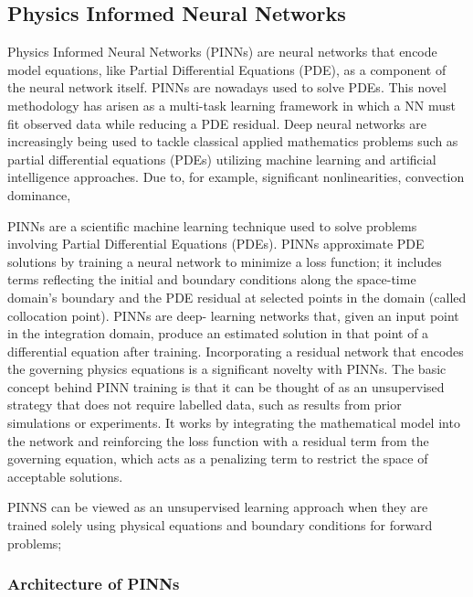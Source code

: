 \documentclass{article}
\begin{document}

\subsection{Physics Informed Neural Networks}

Physics Informed Neural Networks (PINNs) are neural networks that encode model equations, like Partial Differential Equations (PDE), as a component of the neural network itself. PINNs are nowadays used to solve PDEs. This novel methodology has arisen as a multi-task learning framework in which a NN must fit observed data while reducing a PDE residual. 
Deep neural networks are increasingly being used to tackle classical applied mathematics problems such as partial differential equations (PDEs) utilizing machine learning and artificial intelligence approaches. Due to, for example, significant nonlinearities, convection dominance, 


PINNs are a scientific machine learning technique used to solve problems involving Partial Differential Equations (PDEs). PINNs approximate PDE solutions by training a neural network to minimize a loss function; it includes terms reflecting the initial and boundary conditions along the space-time domain’s boundary and the PDE residual at selected points in the domain (called collocation point). PINNs are deep- learning networks that, given an input point in the integration domain, produce an estimated solution in that point of a differential equation after training. Incorporating a residual network that encodes the governing physics equations is a significant novelty with PINNs. The basic concept behind PINN training is that it can be thought of as an unsupervised strategy that does not require labelled data, such as results from prior simulations or experiments.
It works by integrating the mathematical model into the network and reinforcing the loss function with a residual term from the governing equation, which acts as a penalizing term to restrict the space of acceptable solutions.

PINNS can be viewed as an unsupervised learning approach when they are trained solely using physical equations and boundary conditions for forward problems; 


\subsubsection{Architecture of PINNs}
\end{document}
